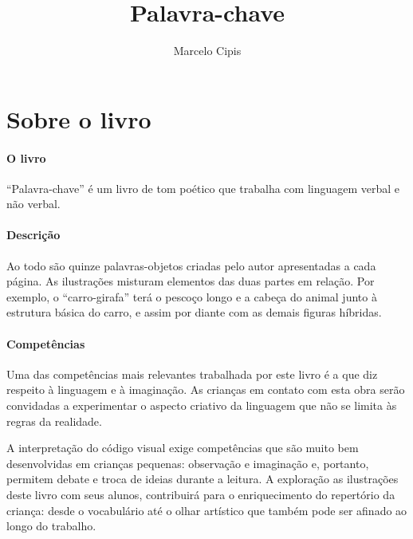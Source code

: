 \documentclass[11pt]{extarticle}
\newcommand{\AutorLivro}{Marcelo Cipis}
\newcommand{\TituloLivro}{Palavra-chave}
\newcommand{\colaborador}{{Paulo Pompermaier e Renier Silva}}
\begin{document}
\title{\TituloLivro}
\author{\AutorLivro}
\def\authornotes{\colaborador}

\date{}
\maketitle


\tableofcontents



\section{Sobre o livro}

\paragraph{O livro} 
``Palavra-chave'' é um livro de tom poético que trabalha
com linguagem verbal e não verbal. 
\paragraph{Descrição} 
Ao todo são quinze palavras-objetos criadas pelo autor apresentadas
a cada página. As ilustrações misturam elementos das duas partes 
em relação. Por exemplo, o ``carro-girafa'' terá o pescoço longo e 
a cabeça do animal junto à estrutura básica do carro, e assim por diante
com as demais figuras híbridas.

\paragraph{Competências} 
Uma das competências mais relevantes trabalhada por este livro
é a que diz respeito à linguagem e à imaginação. 
As crianças em contato com esta obra serão convidadas a experimentar
o aspecto criativo da linguagem que não se limita às regras da
realidade.

A interpretação do código visual 
exige competências que são muito bem desenvolvidas em crianças pequenas: 
observação e imaginação e, portanto, permitem debate e troca de ideias durante 
a leitura. A exploração as ilustrações deste livro com seus alunos, contribuirá 
para o enriquecimento do repertório da criança: desde o vocabulário até o 
olhar artístico que também pode ser afinado ao longo do trabalho.
\end{document}
